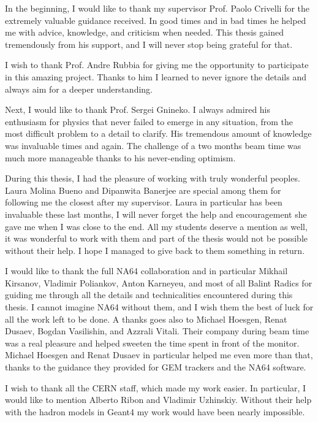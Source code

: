 In the beginning, I would like to thank my supervisor Prof. Paolo Crivelli for the extremely valuable guidance received. In good times and in bad times he helped me with advice, knowledge, and criticism when needed. This thesis gained tremendously from his support, and I will never stop being grateful for that. 

I wish to thank Prof. Andre Rubbia for giving me the opportunity to participate in this amazing project. Thanks to him I learned to never ignore the details and always aim for a deeper understanding.

Next, I would like to thank Prof. Sergei Gnineko. I always admired his enthusiasm for physics that never failed to emerge in any situation, from the most difficult problem to a detail to clarify. His tremendous amount of knowledge was invaluable times and again. The challenge of a two months beam time was much more manageable thanks to his never-ending optimism.

During this thesis, I had the pleasure of working with truly wonderful peoples. Laura Molina Bueno and Dipanwita Banerjee are special among them for following me the closest after my supervisor. Laura in particular has been invaluable these last months, I will never forget the help and encouragement she gave me when I was close to the end. All my students deserve a mention as well, it was wonderful to work with them and part of the thesis would not be possible without their help. I hope I managed to give back to them something in return.

I would like to thank the full NA64 collaboration and in particular Mikhail Kirsanov, Vladimir Poliankov, Anton Karneyeu, and most of all Balint Radics for guiding me through all the details and technicalities encountered during this thesis. I cannot imagine NA64 without them, and I wish them the best of luck for all the work left to be done. A thanks goes also to Michael Hoesgen, Renat Dusaev, Bogdan Vasilishin, and Azzrali Vitali. Their company during beam time was a real pleasure and helped sweeten the time spent in front of the monitor. Michael Hoesgen and Renat Dusaev in particular helped me even more than that, thanks to the guidance they provided for GEM trackers and the NA64 software.

I wish to thank all the CERN staff, which made my work easier. In particular, I would like to mention Alberto Ribon and Vladimir Uzhinskiy. Without their help with the hadron models in Geant4 my work would have been nearly impossible.

